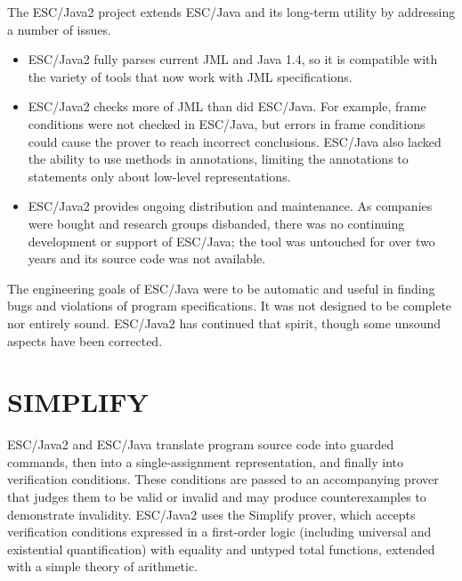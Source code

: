 \documentclass{sig-alternate}
\begin{document}
The ESC/Java2 project extends ESC/Java
and its long-term utility by addressing a number of issues.
\setlength{\partopsep}{0in}\setlength{\parskip}{0in}\setlength{\itemsep}{0in}\setlength{\topsep}{0in}
\begin{itemize}
\setlength{\partopsep}{0in}\setlength{\parskip}{0in}\setlength{\itemsep}{0in}\setlength{\topsep}{0in}

\item ESC/Java2 fully parses current JML and Java 1.4, so it is
compatible with the variety of tools that now work with JML specifications.

\item ESC/Java2 checks more of JML than did ESC/Java.
For example, frame conditions were not checked in ESC/Java, but errors in frame
conditions could cause the prover to reach incorrect conclusions.
ESC/Java also lacked the ability to use methods in
annotations, limiting the annotations to statements only about
low-level representations.

\item ESC/Java2 provides ongoing distribution and maintenance.
As companies were bought and research groups
disbanded, there was no continuing development or support of 
ESC/Java; the tool was untouched for over two years and its
source code was not available. 

\end{itemize}

The engineering goals of ESC/Java were to be automatic and useful in finding bugs
and violations of program specifications.  It was not designed to be complete nor
entirely sound.  ESC/Java2 has continued that spirit, though some unsound aspects have
been corrected.

\section{SIMPLIFY}

ESC/Java2 and ESC/Java translate program source code into guarded commands, then into a single-assignment representation, and 
finally
into verification conditions.  These conditions are passed to an accompanying prover that
judges them to be valid or invalid and may produce counterexamples to demonstrate
invalidity.  ESC/Java2 uses the
Simplify \cite{nelson80,simplify} prover, which accepts verification conditions expressed in a
first-order logic (including universal and existential quantification) with equality and untyped total
functions, extended with a simple theory of arithmetic.
\end{document}
